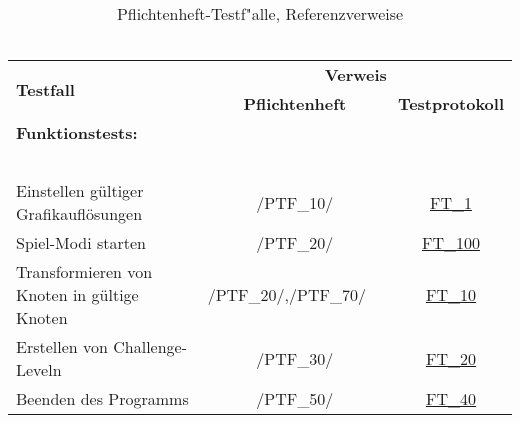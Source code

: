 \begin{longtable}{p{0.5\hsize}p{0.275\hsize}p{0.275\hsize}}

	\caption{Pflichtenheft-Testf{"a}lle, Referenzverweise\\~\\}
	\label{Pflichtenheft:Tests:Referenzverweise}
	\\


	    \multirow{2}{*}{\textbf{Testfall}}
	  & \multicolumn{2}{c}{\textbf{Verweis}}
	  
	  \\ [14pt]
	  
	  & \multicolumn{1}{c}{\textbf{Pflichtenheft}}
	  & \multicolumn{1}{c}{\textbf{Testprotokoll}}
	  
	  \\ 
	     


	  \multicolumn{3}{l}{\textbf{Funktionstests:}}
	  
	\\
	
	  \multicolumn{3}{l}{~}
	  
	\\

	  \multicolumn{1}{L{6.5cm}}{Einstellen gültiger Grafikauflösungen}
	& \multicolumn{1}{c}{/PTF\_10/}
	& \multicolumn{1}{c}{\hyperref[FT:1]{FT\_1}}
	
	\\
	
	
	  \multicolumn{1}{L{6.5cm}}{Spiel-Modi starten}
	& \multicolumn{1}{c}{/PTF\_20/}
	& \multicolumn{1}{c}{\hyperref[FT:100]{FT\_100}}
		
	\\

	  \multicolumn{1}{L{6.5cm}}{Transformieren von Knoten in gültige Knoten}
	& \multicolumn{1}{C{3cm}}{/PTF\_20/,\newline/PTF\_70/~~}
	& \multicolumn{1}{c}{\hyperref[FT:10]{FT\_10}}
	
	\\
	
	 \multicolumn{1}{L{6.5cm}}{Erstellen von Challenge-Leveln}
	& \multicolumn{1}{c}{/PTF\_30/}
	& \multicolumn{1}{c}{\hyperref[FT:20]{FT\_20}}
	
	\\
	
	  \multicolumn{1}{L{6.5cm}}{Beenden des Programms}
	& \multicolumn{1}{c}{/PTF\_50/}
	& \multicolumn{1}{c}{\hyperref[FT:40]{FT\_40}}
	

\end{longtable}
